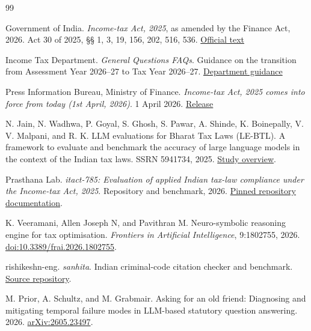 \documentclass[10pt,letterpaper,twocolumn]{article}
\begin{document}
\begin{thebibliography}{99}

\small

Government of India. \textit{Income-tax Act, 2025}, as amended by the Finance Act, 2026. Act 30 of 2025, §§ 1, 3, 19, 156, 202, 516, 536. \href{https://www.incometaxindia.gov.in/documents/d/guest/income\_tax\_act\_2025\_as\_amended\_by\_fa\_act\_2026-pdf}{Official text}

Income Tax Department. \textit{General Questions FAQs}. Guidance on the transition from Assessment Year 2026--27 to Tax Year 2026--27. \href{https://www.incometax.gov.in/iec/foportal/help/all-topics/e-filing-services/General\%20Questions-faqs}{Department guidance}

Press Information Bureau, Ministry of Finance. \textit{Income-tax Act, 2025 comes into force from today (1st April, 2026)}. 1 April 2026. \href{https://www.pib.gov.in/PressReleasePage.aspx?PRID=2248005\&lang=1\&reg=3}{Release}

N. Jain, N. Wadhwa, P. Goyal, S. Ghosh, S. Pawar, A. Shinde, K. Boinepally, V. V. Malpani, and R. K.
LLM evaluations for Bharat Tax Laws (LE-BTL). A framework to evaluate and benchmark the accuracy of large language models in the context of the Indian tax laws. SSRN 5941734, 2025.
\href{https://www.taxmann.com/post/blog/taxmann-ai-x-iit-kharagpur-llm-evaluation-le-btl-benchmark-study}{Study overview}.

Prasthana Lab. \emph{itact-785: Evaluation of applied Indian tax-law compliance under the Income-tax Act, 2025}. Repository and benchmark, 2026.
\href{https://github.com/bugyal/itact-785/blob/30f97fdd2adc1b4c301832bd4116c642cd856eca/README.md}{Pinned repository documentation}.

K. Veeramani, Allen Joseph N, and Pavithran M.
Neuro-symbolic reasoning engine for tax optimisation. \emph{Frontiers in Artificial Intelligence}, 9:1802755, 2026.
\href{https://doi.org/10.3389/frai.2026.1802755}{doi:10.3389/frai.2026.1802755}.

rishikeshn-eng. \emph{sanhita}. Indian criminal-code citation checker and benchmark.
\href{https://github.com/rishikeshn-eng/sanhita}{Source repository}.

M. Prior, A. Schultz, and M. Grabmair.
Asking for an old friend: Diagnosing and mitigating temporal failure modes in LLM-based statutory question answering. 2026.
\href{https://arxiv.org/abs/2605.23497}{arXiv:2605.23497}.


\end{thebibliography}
\end{document}
